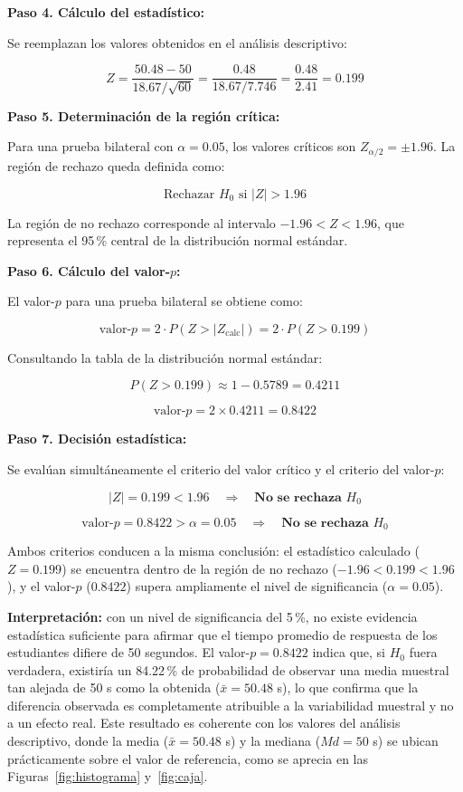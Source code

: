 \documentclass[12pt,letterpaper]{article}
\begin{document}
\textbf{Paso 4. Cálculo del estadístico:}

Se reemplazan los valores obtenidos en el análisis descriptivo:

\[
Z = \frac{50.48 - 50}{18.67 / \sqrt{60}}
  = \frac{0.48}{18.67 / 7.746}
  = \frac{0.48}{2.41}
  = 0.199
\]

\textbf{Paso 5. Determinación de la región crítica:}

Para una prueba bilateral con $\alpha = 0.05$, los valores críticos son
$Z_{\alpha/2} = \pm 1.96$. La región de rechazo queda definida como:

\[
\text{Rechazar } H_0 \text{ si } |Z| > 1.96
\]

La región de no rechazo corresponde al intervalo $-1.96 < Z < 1.96$, que representa
el 95\,\% central de la distribución normal estándar.

\textbf{Paso 6. Cálculo del valor-$p$:}

El valor-$p$ para una prueba bilateral se obtiene como:

\[
\text{valor-}p = 2 \cdot P(Z > |Z_{\text{calc}}|) = 2 \cdot P(Z > 0.199)
\]

Consultando la tabla de la distribución normal estándar:

\[
P(Z > 0.199) \approx 1 - 0.5789 = 0.4211
\]

\[
\text{valor-}p = 2 \times 0.4211 = 0.8422
\]

\textbf{Paso 7. Decisión estadística:}

Se evalúan simultáneamente el criterio del valor crítico y el criterio del valor-$p$:

\[
|Z| = 0.199 < 1.96 \quad \Rightarrow \quad \textbf{No se rechaza } H_0
\]

\[
\text{valor-}p = 0.8422 > \alpha = 0.05 \quad \Rightarrow \quad
\textbf{No se rechaza } H_0
\]

Ambos criterios conducen a la misma conclusión: el estadístico calculado
($Z = 0.199$) se encuentra dentro de la región de no rechazo
($-1.96 < 0.199 < 1.96$), y el valor-$p$ ($0.8422$) supera ampliamente el
nivel de significancia ($\alpha = 0.05$).

\textbf{Interpretación:} con un nivel de significancia del 5\,\%, no existe evidencia
estadística suficiente para afirmar que el tiempo promedio de respuesta de los
estudiantes difiere de 50 segundos. El valor-$p = 0.8422$ indica que, si $H_0$ fuera
verdadera, existiría un 84.22\,\% de probabilidad de observar una media muestral tan
alejada de 50 s como la obtenida ($\bar{x} = 50.48$ s), lo que confirma que la
diferencia observada es completamente atribuible a la variabilidad muestral y no a un
efecto real. Este resultado es coherente con los valores del análisis descriptivo, donde
la media ($\bar{x} = 50.48$ s) y la mediana ($Md = 50$ s) se ubican prácticamente sobre
el valor de referencia, como se aprecia en las Figuras~\ref{fig:histograma}
y~\ref{fig:caja}.
\end{document}
